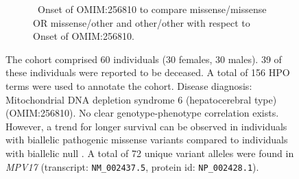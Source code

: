 \begin{figure}[htbp]
        \vspace{0.2em}
        
        \begin{subfigure}[b]{0.95\textwidth}
        \captionsetup{justification=raggedright,singlelinecheck=false}
        \caption{ Onset of OMIM:256810 to compare missense/missense OR missense/other and other/other with respect to Onset of OMIM:256810. }
        \end{subfigure}
        
        \vspace{0.2em}
        
        \caption{ The cohort comprised 60 individuals (30 females, 30 males). 39 of these individuals were reported to be deceased. 
        A total of 156 HPO terms were used to annotate the cohort. Disease diagnosis: Mitochondrial DNA depletion syndrome 6 (hepatocerebral type) (OMIM:256810). 
        No clear genotype-phenotype correlation exists. However, a trend for longer survival can be observed in individuals with biallelic pathogenic 
        missense variants compared to individuals with biallelic null \cite{PMID_20074988,PMID_22593919}. 
        A total of 72 unique variant alleles were found in \textit{MPV17} (transcript: \texttt{NM\_002437.5}, protein id: \texttt{NP\_002428.1}).}
        \end{figure}
        